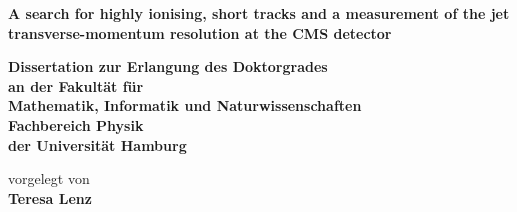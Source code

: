 \begin{titlepage}
   \begin{center}
     \thispagestyle{empty}
     \vspace*{0.1cm}
     \linespread{1.5}
       {\huge\bfseries A search for highly ionising, short tracks and a measurement of the jet transverse-momentum resolution at the CMS detector\par}
       \begin{Large} 
         \textbf{Dissertation zur Erlangung des Doktorgrades\\
                 an der Fakult\"{a}t f\"{u}r\\
                 Mathematik, Informatik und Naturwissenschaften\\
                 Fachbereich Physik\\
                 der Universit\"{a}t Hamburg\\}
       \end{Large}
       \vskip2cm
       \begin{large}
         vorgelegt von\\
         {\bf Teresa Lenz}
         \vfill
       \end{large}
   \end{center}
 \end{titlepage}
 
 
 \newpage 
 
